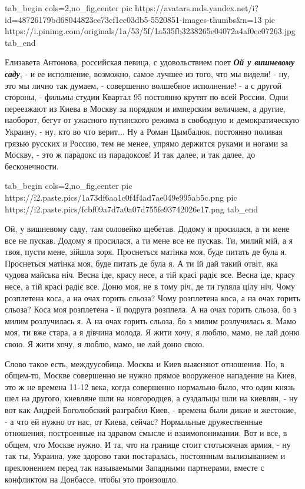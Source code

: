 \ifcmt
  tab_begin cols=2,no_fig,center
     pic https://avatars.mds.yandex.net/i?id=48726179bd68044823ce73cf1ec03db5-5520851-images-thumbs&n=13
		 pic https://i.pinimg.com/originals/1a/53/5f/1a535fb3238265e04072a4af0ec07263.jpg
  tab_end
\fi

Елизавета Антонова, российская певица, с удовольствием поет \textbf{\emph{Ой у
вишневому саду}}, - и ее исполнение, возможно, самое лучшее из того, что мы
видели! - ну, это мы лично так думаем, - совершенно волшебное исполнение! - а с
другой стороны, - фильмы студии Квартал 95 постоянно крутят по всей России.
Одни переезжают из Киева в Москву за порядком и имперским величием, а другие,
наоборот, бегут от ужасного путинского режима в свободную и демократическую
Украину, - ну, кто во что верит... Ну а Роман Цымбалюк, постоянно поливая грязью
русских и Россию, тем не менее, упрямо держится руками и ногами за Москву, -
это ж парадокс из парадоксов! И так далее, и так далее, до бесконечности.

\ifcmt
  tab_begin cols=2,no_fig,center
     pic https://i2.paste.pics/1a73df6aa1c0f4f4ad7ae049e995ab5c.png
		 pic https://i2.paste.pics/fcbf09a7d7a0a07d755fe93742026e17.png
  tab_end
\fi

\raggedcolumns
\begin{multicols}{2} %
\setlength{\parindent}{0pt}
\obeycr
Ой, у вишневому саду, там соловейко щебетав.
Додому я просилася, а ти мене все не пускав.
Додому я просилася, а ти мене все не пускав.
\smallskip
Ти, милий мій, а я твоя, пусти мене, зійшла зоря.
Проснеться матінка моя, буде питать де була я.
Проснеться матінка моя, буде питать де була я.
\smallskip
А ти їй дай такий отвіт, яка чудова майська ніч.
Весна іде, красу несе, а тій красі радіє все.
Весна іде, красу несе, а тій красі радіє все.
\smallskip
Доню моя, не в тому річ, де ти гуляла цілу ніч.
Чому розплетена коса, а на очах горить сльоза?
Чому розплетена коса, а на очах горить сльоза?
\smallskip
Коса моя розплетена - її подруга розплела.
А на очах горить сльоза, бо з милим розлучилась я.
А на очах горить сльоза, бо з милим розлучилась я.
\smallskip
Мамо моя, ти вже стара, а я дівчина молода.
Я жити хочу, я люблю, мамо, не лай доню свою.
Я жити хочу, я люблю, мамо, не лай доню свою.
\restorecr
\end{multicols} %

Слово такое есть, междуусобица.  Москва и Киев выясняют
отношения. Но, в общем-то, Москве совершенно не нужно прямое вооруженое
нападение на Киев, это ж не времена 11-12 века, когда совершенно нормально
было, что один князь шел на другого, киевляне шли на новгородцев, а суздальцы
шли на киевлян, - ну вот как Андрей Боголюбский разграбил Киев, - времена были
дикие и жестокие, - а что ей нужно от нас, от Киева, сейчас?  Нормальные
дружественные отношения, построенные на здравом смысле и взаимопонимании. Вот и
все, в общем, что Москве нужно. И та, что на границе стоит стотысячная армия, -
ну так ты, Украина, уже здорово таки постаралась, постоянным вылизыванием и
преклонением перед так называемыми Западными партнерами, вместе с конфликтом на
Донбассе, чтобы это произошло.

